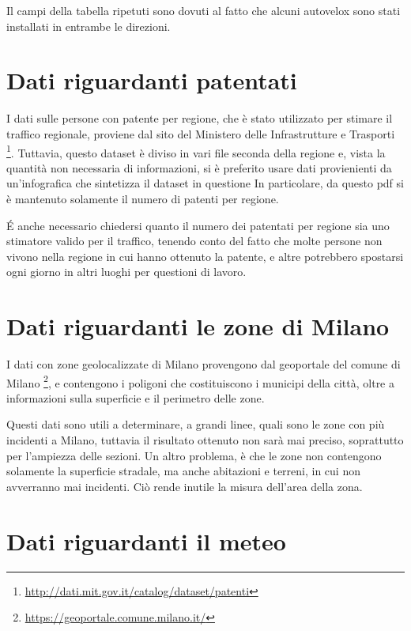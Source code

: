 \documentclass[a4paper]{report}
\begin{document}

Il campi della tabella ripetuti sono dovuti al fatto che alcuni autovelox sono stati installati in entrambe le direzioni.

\section{Dati riguardanti patentati}

I dati sulle persone con patente per regione, che è stato utilizzato per stimare il traffico 
regionale, proviene dal sito del Ministero delle Infrastrutture e Trasporti 
\footnote{\url{http://dati.mit.gov.it/catalog/dataset/patenti}}.
Tuttavia, questo dataset è diviso in vari file seconda della regione e, vista la quantità 
non necessaria di informazioni, si è preferito usare dati provienienti da un'infografica che 
sintetizza il dataset in questione \cite{INFOGRAFICA_MIT:1}
In particolare, da questo pdf si è mantenuto solamente il numero di patenti per regione.

\'E anche necessario chiedersi quanto il numero dei patentati per regione sia uno stimatore 
valido per il traffico, tenendo conto del fatto che molte persone non vivono nella regione 
in cui hanno ottenuto la patente, e altre potrebbero spostarsi ogni giorno in altri 
luoghi per questioni di lavoro.

\section{Dati riguardanti le zone di Milano}

I dati con zone geolocalizzate di Milano provengono dal geoportale del comune di Milano
\footnote{\url{https://geoportale.comune.milano.it/}}, e contengono i poligoni che costituiscono 
i municipi della città, 
oltre a informazioni sulla superficie e il perimetro delle zone.

Questi dati sono utili a determinare, a grandi linee, quali sono le zone con più incidenti 
a Milano, tuttavia il risultato ottenuto non sarà mai preciso, 
soprattutto per l'ampiezza delle sezioni.
Un altro problema, è che le zone non contengono solamente la superficie stradale, ma anche 
abitazioni e terreni, in cui non avverranno mai incidenti. 
Ciò rende inutile la misura dell'area della zona.

\section{Dati riguardanti il meteo}
\end{document}
